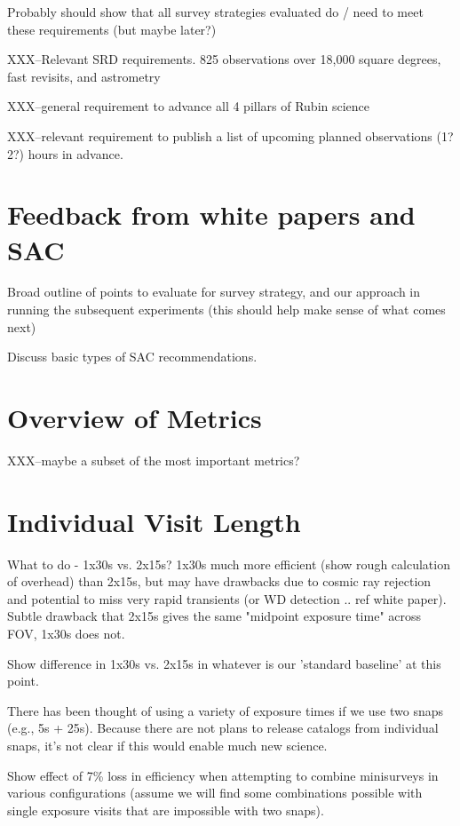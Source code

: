 Probably should show that all survey strategies evaluated do / need to meet these requirements (but maybe later?)

XXX--Relevant SRD requirements. 825 observations over 18,000 square degrees, fast revisits, and astrometry

XXX--general requirement to advance all 4 pillars of Rubin science

XXX--relevant requirement to publish a list of upcoming planned observations (1?2?) hours in advance. 

\section{Feedback from white papers and SAC} 
Broad outline of points to evaluate for survey strategy, and our approach in running the subsequent experiments (this should help make sense of what comes next)

Discuss basic types of SAC recommendations. 

\section{Overview of Metrics}
XXX--maybe a subset of the most important metrics? 
%






\section{Individual Visit Length}
What to do - 1x30s vs. 2x15s? 1x30s much more efficient (show rough calculation of overhead) than 2x15s, but may have drawbacks due to cosmic ray rejection and potential to miss very rapid transients (or WD detection .. ref white paper). Subtle drawback that 2x15s gives the same "midpoint exposure time" across FOV, 1x30s does not. 

Show difference in 1x30s vs. 2x15s in whatever is our 'standard baseline' at this point. 

There has been thought of using a variety of exposure times if we use two snaps (e.g., 5s + 25s). Because there are not plans to release catalogs from individual snaps, it's not clear if this would enable much new science.

Show effect of 7\% loss in efficiency when attempting to combine minisurveys in various configurations (assume we will find some combinations possible with single exposure visits that are impossible with two snaps). 

